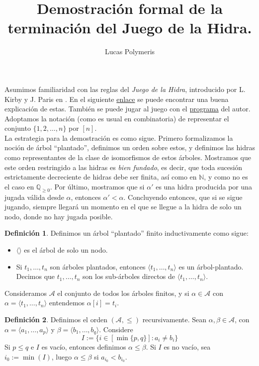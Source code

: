 \documentclass[a4paper,11pt]{article}
\title{Demostración formal de la terminación del Juego de la Hidra.}
\author{Lucas Polymeris}
\newcommand{\matN}{\mathbb{N}}
\newcommand{\mA}{\mathcal{A}}
\newcommand{\lag}{\langle}
\newcommand{\rag}{\rangle}
\theoremstyle{definition}
\newtheorem{definition}{Definición}
\begin{document}
\maketitle

Asumimos familiaridad con las reglas del {\em Juego de la Hidra},
introducido por L. Kirby y J. Paris en \cite{hydra}. En el siguiente
\href{https://slate.com/human-interest/2014/06/hydra-game-an-example-of-a-counterintuitive-mathematical-result.html}{enlace}
se puede encontrar una buena explicación de estas. También
se puede jugar al juego con el \href{https://github.com/Average-user/hydra-game#readme}{programa} del autor. Adoptamos la notación
(como es usual en combinatoria) de representar el conjunto $\{1,2,\dots,n\}$
por $[n]$.\\

La estrategia para la demostración es como sigue. Primero formalizamos la noción
de árbol ``plantado'', definimos un orden sobre estos, y definimos las
hidras como representantes de la clase de isomorfismos de estos árboles. Mostramos que
este orden restringido a las hidras es {\em bien fundado}, es decir, que toda sucesión estrictamente
decreciente de hidras debe ser finita, así como en $\matN$, y como no
es el caso en $\mathbb{Q}_{\geq 0}$. Por último, mostramos que si $\alpha'$ es una hidra producida
por una jugada válida desde $\alpha$, entonces $\alpha' < \alpha$. Concluyendo
entonces, que si se sigue jugando, siempre llegará un momento en el que
se llegue a la hidra de solo un nodo, donde no hay jugada posible.

\begin{definition}
  Definimos un árbol ``plantado'' finito inductivamente como sigue:
  \begin{itemize}
  \itemsep0em
  \item $\lag\rag$ es el árbol de solo un nodo.
  \item Si $t_1,\dots,t_n$ son árboles plantados, entonces $\lag t_1,\dots,t_n\rag$ es un árbol-plantado.
    Decimos que $t_1,\dots,t_n$ son los sub-árboles directos de $\lag t_1,\dots,t_n \rag$.
  \end{itemize}
  Consideramos $\mathcal{A}$ el conjunto de todos los árboles finitos, y si
  $\alpha \in \mA$ con $\alpha = \lag t_1,\dots,t_n \rag$ entendemos
   $\alpha[i] = t_i$.
\end{definition}

\begin{definition}
  Definimos el orden $(\mA,\leq)$ recursivamente. Sean $\alpha,\beta \in \mA$,
  con $\alpha = \lag a_1,\dots,a_p \rag$ y $\beta = \lag b_1,\dots,b_q \rag$. Considere
  $$I := \{i \in [\min\{p,q\}] : a_i \neq b_i\}$$ Si $p \leq q$ e $I$ es vacío,
  entonces definimos $\alpha \leq \beta$.
  Si $I$ es no vacío, sea $i_0 := \min(I)$, luego $\alpha \leq \beta$ si
  $a_{i_0} < b_{i_0}$.
\end{definition}
\end{document}
